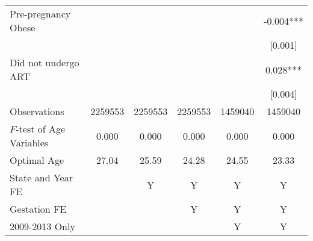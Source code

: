 \documentclass[10pt,letterpaper,subeqn]{beamer}
\begin{document}
\begin{frame}
\begin{table}[htbp]
{\begin{tabular}{l*{5}{c}}
      Pre-pregnancy Obese &               &               &               &               &     -0.004***\\
      &               &               &               &               &     [0.001]   \\
      Did not undergo ART &               &               &               &               &       0.028***\\
      &               &               &               &               &     [0.004]   \\
      \midrule
      Observations        &     2259553   &     2259553   &     2259553   &     1459040   &     1459040   \\
      $F$-test of Age Variables&0.000&0.000&0.000&0.000&0.000 \\
      Optimal Age &27.04&25.59&24.28&24.55&23.33 \\
      State and Year FE&&Y&Y&Y&Y\\
      Gestation FE &&&Y&Y&Y\\
      2009-2013 Only&&&&Y&Y\\ \bottomrule
\end{tabular}}\end{table}
\end{frame}
\end{document}
